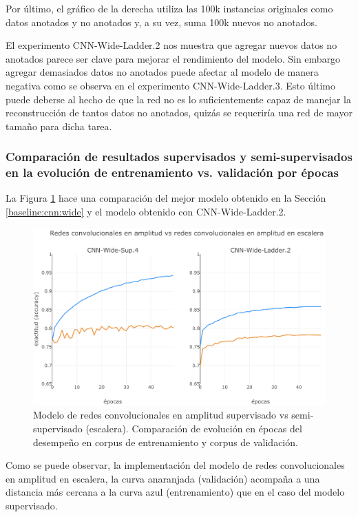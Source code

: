 Por último, el gráfico de la derecha utiliza las 100k instancias originales como datos anotados y no anotados 
y, a su vez, suma 100k nuevos no anotados. 

El experimento CNN-Wide-Ladder.2 nos muestra que agregar nuevos datos no anotados parece ser clave para 
mejorar el rendimiento del modelo. Sin embargo agregar demasiados datos no anotados puede afectar al modelo de
manera negativa como se observa en el experimento CNN-Wide-Ladder.3. Esto último puede deberse al hecho de que
la red no es lo suficientemente capaz de manejar la reconstrucción de tantos datos no anotados, quizás se 
requeriría una red de mayor tamaño para dicha tarea.

\subsubsection{Comparación de resultados supervisados y semi-supervisados en la evolución de entrenamiento vs.
validación por épocas}

La Figura \ref{fig:CNN_wide_supervised_ladder} hace una comparación del mejor modelo obtenido en
la Sección \ref{baseline:cnn:wide} y el modelo obtenido con CNN-Wide-Ladder.2. 

\begin{figure}[t]
\begin{center}
\includegraphics[width=.9\linewidth]{images/CNN_wide_supervised_ladder.png}
\caption{Modelo de redes convolucionales en amplitud supervisado vs semi-supervisado (escalera). Comparación
de evolución en épocas del desempeño en corpus de entrenamiento y corpus de validación.}
\label{fig:CNN_wide_supervised_ladder}
\end{center}
\end{figure}

Como se puede observar, la implementación del modelo de redes convolucionales en amplitud en escalera, la 
curva anaranjada (validación) acompaña a una distancia más cercana a la curva azul (entrenamiento) que en el 
caso del modelo supervisado. 

